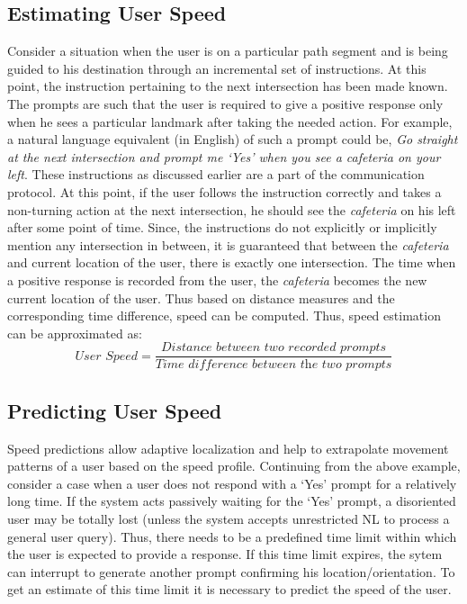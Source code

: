 \documentclass{iitkthesis}
\begin{document}
\subsection{Estimating User Speed}
Consider a situation when the user is on a particular path segment and 
is being guided to his destination through an incremental set of 
instructions. At this point, the instruction pertaining to the next 
intersection has been made known. The prompts are such that the user is 
required to give a positive response only when he sees a particular 
landmark after taking the needed action. For example, a natural language 
equivalent (in English) of such a prompt could be, \textit{Go straight at 
the next intersection and prompt me `Yes' when you see a cafeteria on 
your left}. These instructions as discussed earlier are a part of the 
communication protocol. At this point, if the user follows the 
instruction correctly and takes a non-turning action at the next 
intersection, he should see the \textit{cafeteria} on his left after some 
point of time. Since, the instructions do not explicitly or implicitly 
mention any intersection in between, it is guaranteed that between 
the \textit{cafeteria} and current location of the user, there is exactly 
one intersection. The time when a positive response is recorded from the 
user, the \textit{cafeteria} becomes the new current location of the user.
Thus based on distance measures and the corresponding time difference, 
speed can be computed. Thus, speed estimation can be approximated  as:
\[\displaystyle \textit{User Speed}=\frac{\textit{Distance between two recorded prompts}}{\textit{Time difference between the two prompts}}\]
\subsection{Predicting User Speed}
\label{sect:predictspeed}
Speed predictions allow adaptive localization 
and help to extrapolate movement patterns of a user based on the speed 
profile. Continuing from the above example, consider a case when a user 
does not respond with a `Yes' prompt for a relatively long time. If the 
system acts passively waiting for the `Yes' prompt, a disoriented user 
may be totally lost (unless the system accepts unrestricted NL to process 
a general user query). Thus, there needs to be a predefined time limit within 
which the user is expected to provide a response. If this time limit 
expires, the sytem can interrupt to generate another prompt confirming 
his location/orientation. To get an estimate of this time limit it is 
necessary to predict the speed of the user. 
\end{document}
